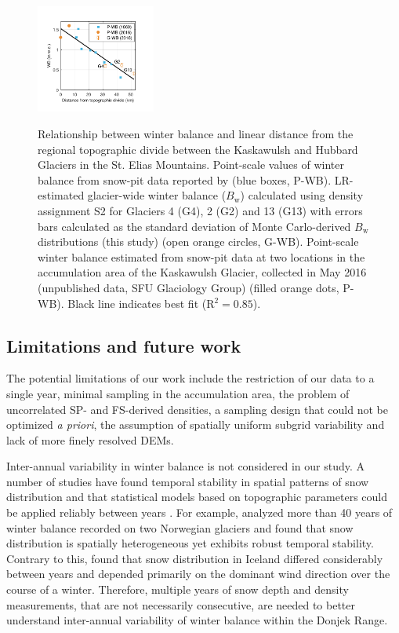 \documentclass[review,oneside, letterpaper]{igs}
\begin{document}
\begin{figure}
	\centering
	\includegraphics[width =0.35\textwidth]{AccumGrad.pdf}\\
	\caption{Relationship between winter balance and linear distance from the regional topographic divide between the Kaskawulsh and Hubbard Glaciers in the St. Elias Mountains. Point-scale values of winter balance from snow-pit data reported by \cite{Taylor1969} (blue boxes, P-WB). LR-estimated glacier-wide winter balance ($B_\mathrm{w}$) calculated using density assignment S2 for Glaciers 4 (G4), 2 (G2) and 13 (G13) with errors bars calculated as the standard deviation of Monte Carlo-derived $B_\mathrm{w}$ distributions (this study) (open orange circles, G-WB). Point-scale winter balance estimated from snow-pit data at two locations in the accumulation area of the Kaskawulsh Glacier, collected in May 2016 (unpublished data, SFU Glaciology Group) (filled orange dots, P-WB). Black line indicates best fit (R$^2=0.85$).}
	\label{fig:AccumGrad}
\end{figure}

\subsection{Limitations and future work}

The potential limitations of our work include the restriction of our data to a single year, minimal sampling in the accumulation area, the problem of uncorrelated SP- and FS-derived densities, a sampling design that could not be optimized \textit{a priori}, the assumption of spatially uniform subgrid variability and lack of more finely resolved DEMs.

Inter-annual variability in winter balance is not considered in our study. A number of studies have found temporal stability in spatial patterns of snow distribution and that statistical models based on topographic parameters could be applied reliably between years \citep[e.g.][]{Grunewald2013}. For example, \cite{Walmsley2015} analyzed more than 40 years of winter balance recorded on two Norwegian glaciers and found that snow distribution is spatially heterogeneous yet exhibits robust temporal stability. Contrary to this, \cite{Crochet2007} found that snow distribution in Iceland differed considerably between years and depended primarily on the dominant wind direction over the course of a winter. Therefore, multiple years of snow depth and density measurements, that are not necessarily consecutive, are needed to better understand inter-annual variability of winter balance within the Donjek Range.
\end{document}
